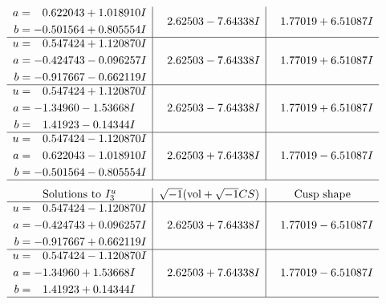 \documentclass[1p]{elsarticle_modified}
\theoremstyle{definition}
\newcommand{\I}{\sqrt{-1}}
\begin{document}
$$\begin{array}{c|c|c}
\begin{aligned}
a &= \phantom{-}0.622043 + 1.018910 I \\
b &= -0.501564 + 0.805554 I\end{aligned}
 & \phantom{-}2.62503 - 7.64338 I & \phantom{-}1.77019 + 6.51087 I \\ \hline\begin{aligned}
u &= \phantom{-}0.547424 + 1.120870 I \\
a &= -0.424743 - 0.096257 I \\
b &= -0.917667 - 0.662119 I\end{aligned}
 & \phantom{-}2.62503 - 7.64338 I & \phantom{-}1.77019 + 6.51087 I \\ \hline\begin{aligned}
u &= \phantom{-}0.547424 + 1.120870 I \\
a &= -1.34960 - 1.53668 I \\
b &= \phantom{-}1.41923 - 0.14344 I\end{aligned}
 & \phantom{-}2.62503 - 7.64338 I & \phantom{-}1.77019 + 6.51087 I \\ \hline\begin{aligned}
u &= \phantom{-}0.547424 - 1.120870 I \\
a &= \phantom{-}0.622043 - 1.018910 I \\
b &= -0.501564 - 0.805554 I\end{aligned}
 & \phantom{-}2.62503 + 7.64338 I & \phantom{-}1.77019 - 6.51087 I\\
 \hline 
 \end{array}$$\newpage$$\begin{array}{c|c|c}  
\text{Solutions to }I^u_{3}& \I (\text{vol} + \sqrt{-1}CS) & \text{Cusp shape}\\
 \hline 
\begin{aligned}
u &= \phantom{-}0.547424 - 1.120870 I \\
a &= -0.424743 + 0.096257 I \\
b &= -0.917667 + 0.662119 I\end{aligned}
 & \phantom{-}2.62503 + 7.64338 I & \phantom{-}1.77019 - 6.51087 I \\ \hline\begin{aligned}
u &= \phantom{-}0.547424 - 1.120870 I \\
a &= -1.34960 + 1.53668 I \\
b &= \phantom{-}1.41923 + 0.14344 I\end{aligned}
 & \phantom{-}2.62503 + 7.64338 I & \phantom{-}1.77019 - 6.51087 I\\
 \hline 
 \end{array}$$\newpage\newpage\renewcommand{\arraystretch}{1}
\end{document}
